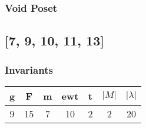 \documentclass[a4paper]{article}
\begin{document}
\hfill\begin{minipage}{0.48\textwidth}
\subsubsection*{Void Poset}
\centering
{}
\end{minipage}
\newpage\subsection{[7, 9, 10, 11, 13]}
\noindent\begin{minipage}{0.6\textwidth}
\subsubsection*{Invariants}
\centering
\begin{tabular}{|c|c|c|c|c|c|c|}
\toprule
g & F & m & ewt & t & \(|M|\) & \(|\lambda|\) \\
\midrule
9 & 15 & 7 & 10 & 2 & 2 & 20 \\
\bottomrule
\end{tabular}
\end{minipage}%
\end{document}
